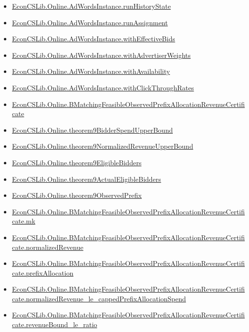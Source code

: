 \documentclass[10pt]{article}
\begin{document}
\begin{itemize}[leftmargin=1.2em]
\begin{itemize}[leftmargin=1.2em]
\item \hyperlink{library-prerequisite-562edb4830d7a4b7}{EconCSLib.Online.AdWordsInstance.runHistoryState}
\item \hyperlink{library-prerequisite-ecfceb26ad2bc746}{EconCSLib.Online.AdWordsInstance.runAssignment}
\item \hyperlink{library-prerequisite-b826790b7a4520a1}{EconCSLib.Online.AdWordsInstance.withEffectiveBids}
\item \hyperlink{library-prerequisite-8155eac49b31ac30}{EconCSLib.Online.AdWordsInstance.withAdvertiserWeights}
\item \hyperlink{library-prerequisite-914ac8ec2a8abe49}{EconCSLib.Online.AdWordsInstance.withAvailability}
\item \hyperlink{library-prerequisite-ae53493f66323d59}{EconCSLib.Online.AdWordsInstance.withClickThroughRates}
\item \hyperlink{library-prerequisite-d353aa04ac9819ac}{EconCSLib.Online.BMatchingFeasibleObservedPrefixAllocationRevenueCertificate}
\item \hyperlink{library-prerequisite-dba0806358517891}{EconCSLib.Online.theorem9BidderSpendUpperBound}
\item \hyperlink{library-prerequisite-b90067018d01aebd}{EconCSLib.Online.theorem9NormalizedRevenueUpperBound}
\item \hyperlink{library-prerequisite-69b47366787e307c}{EconCSLib.Online.theorem9EligibleBidders}
\item \hyperlink{library-prerequisite-a14d6ceb8f63dc41}{EconCSLib.Online.theorem9ActualEligibleBidders}
\item \hyperlink{library-prerequisite-d6c4a04e9f21fc33}{EconCSLib.Online.theorem9ObservedPrefix}
\item \hyperlink{library-prerequisite-00c47cfabd6c55af}{EconCSLib.Online.BMatchingFeasibleObservedPrefixAllocationRevenueCertificate.mk}
\item \hyperlink{library-prerequisite-13015a4675485f90}{EconCSLib.Online.BMatchingFeasibleObservedPrefixAllocationRevenueCertificate.normalizedRevenue}
\item \hyperlink{library-prerequisite-143d71ed83f2f520}{EconCSLib.Online.BMatchingFeasibleObservedPrefixAllocationRevenueCertificate.prefixAllocation}
\item \hyperlink{library-prerequisite-0cebab9d958add99}{EconCSLib.Online.BMatchingFeasibleObservedPrefixAllocationRevenueCertificate.normalizedRevenue\_le\_cappedPrefixAllocationSpend}
\item \hyperlink{library-prerequisite-c2f3c9aeccd6f746}{EconCSLib.Online.BMatchingFeasibleObservedPrefixAllocationRevenueCertificate.revenueBound\_le\_ratio}

\end{itemize}
\end{itemize}
\end{document}
